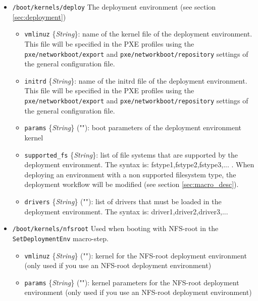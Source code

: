 \documentclass[a4wide,10pt,oneside]{book}
\newcommand{\ypath}[1]{\texttt{#1}}
\newcommand{\yfield}[2]{\texttt{#1} {\small\{{\emph{#2}}\}}:}
\newcommand{\yfieldd}[3]{\texttt{#1} {\small\{{\emph{#2}}\}} {\small(}#3{\small)}:}
\begin{document}
\begin{itemize}
  \item \ypath{/boot/kernels/deploy} The deployment environment (see section \ref{sec:deployment})
  \begin{itemize}
    \item \yfield{vmlinuz}{String} name of the kernel file of the deployment environment. This file will be specified in the PXE profiles using the \ypath{pxe/networkboot/export} and \ypath{pxe/networkboot/repository} settings of the general configuration file.
    \item \yfield{initrd}{String} name of the initrd file of the deployment environment. This file will be specified in the PXE profiles using the \ypath{pxe/networkboot/export} and \ypath{pxe/networkboot/repository} settings of the general configuration file.
    \item \yfieldd{params}{String}{""} boot parameters of the deployment environment kernel
    \item \yfield{supported\_fs}{String} list of file systems that are supported by the deployment environment. The syntax is: fstype1,fstype2,fstype3,... . When deploying an environment with a non supported filesystem type, the deployment workflow will be modified (see section \ref{sec:macro_desc}).
    \item \yfieldd{drivers}{String}{""} list of drivers that must be loaded in the deployment environment. The syntax is: driver1,driver2,driver3,...
  \end{itemize}

  \item \ypath{/boot/kernels/nfsroot} Used when booting with NFS-root in the \texttt{SetDeploymentEnv} macro-step.
  \begin{itemize}
    \item \yfieldd{vmlinuz}{String}{""} kernel for the NFS-root deployment environment (only used if you use an NFS-root deployment environment)
    \item \yfieldd{params}{String}{""} kernel parameters for the NFS-root deployment environment (only used if you use an NFS-root deployment environment)
  \end{itemize}



\end{itemize}
\end{document}
